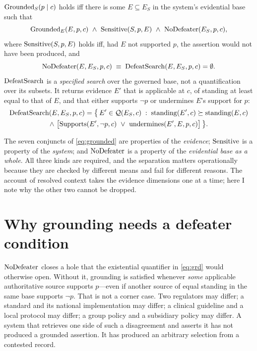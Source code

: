 \begin{definition}
\label{def:grounding}
$\operatorname{Grounded}_S(p \mid c)$ holds iff there is some $E \subseteq E_S$ in the system's
evidential base such that
\begin{equation}
  \operatorname{Grounded}_{E}(E, p, c) \ \wedge\ \operatorname{Sensitive}(S, p, E) \ \wedge\ \operatorname{NoDefeater}(E_S, p, c),
  \label{eq:grd}
\end{equation}
where $\operatorname{Sensitive}(S, p, E)$ holds iff, had $E$ not supported $p$, the assertion would
not have been produced, and
\begin{equation}
  \operatorname{NoDefeater}(E, E_S, p, c) \;\equiv\; \operatorname{DefeatSearch}(E, E_S, p, c) = \emptyset .
  \label{eq:nodefeater}
\end{equation}
$\operatorname{DefeatSearch}$ is a \emph{specified search} over the governed base, not a
quantification over its subsets. It returns evidence $E'$ that is applicable at $c$, of
standing at least equal to that of $E$, and that either supports $\neg p$ or undermines
$E$'s support for $p$:
\begin{multline}
  \operatorname{DefeatSearch}(E, E_S, p, c) = \bigl\{\, E' \in \mathcal{Q}(E_S, c) \;:\;
    \operatorname{standing}(E', c) \succeq \operatorname{standing}(E, c)\\
    \wedge\ \bigl[\operatorname{Supports}(E', \neg p, c)
      \ \vee\ \text{undermines}(E', E, p, c)\bigr] \,\bigr\}.
  \label{eq:defeatersearch}
\end{multline}
\end{definition}

The seven conjuncts of \eqref{eq:grounded} are properties of the \emph{evidence};
$\operatorname{Sensitive}$ is a property of the \emph{system}; and $\operatorname{NoDefeater}$ is a property of
the \emph{evidential base as a whole}. All three kinds are required, and the
separation matters operationally because they are checked by different means and fail
for different reasons. The account of resolved context takes the evidence
dimensions one at a time; here I note why the other two cannot be dropped.

\section{Why grounding needs a defeater condition}
\label{sec:why-defeater}

$\operatorname{NoDefeater}$ closes a hole that the existential quantifier in \eqref{eq:grd} would
otherwise open. Without it, grounding is satisfied whenever \emph{some} applicable
authoritative source supports $p$---even if another source of equal standing in the same
base supports $\neg p$. That is not a corner case. Two regulators may differ; a standard
and its national implementation may differ; a clinical guideline and a local protocol
may differ; a group policy and a subsidiary policy may differ. A system that retrieves
one side of such a disagreement and asserts it has not produced a grounded assertion. It
has produced an arbitrary selection from a contested record.

